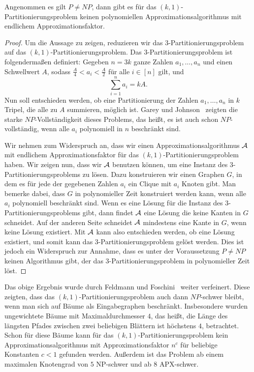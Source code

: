 \begin{thm}\label{thm:np_comp}
    Angenommen es gilt $P \neq NP$, dann gibt es für das $(k,1)$\hyp Partitionierungsproblem keinen polynomiellen Approximationsalgorithmus mit endlichem Approximationsfaktor.
\end{thm}
\begin{proof}
    Um die Aussage zu zeigen, reduzieren wir das $3$\hyp Partitionierungsproblem auf das $(k,1)$\hyp Partitionierungsproblem. 
    Das $3$\hyp Partitionierungsproblem ist folgendermaßen definiert: Gegeben $n = 3k$ ganze Zahlen $a_1,\ldots, a_n$ und einen Schwellwert $A$, sodass $\frac{A}{4} < a_i < \frac{A}{2}$ für alle $i \in [n]$ gilt, und 
    \begin{equation*}
        \sum_{i=1}^{n} a_i = kA.
    \end{equation*}
    Nun soll entschieden werden, ob eine Partitionierung der Zahlen $a_1, \ldots, a_n$ in $k$ Tripel, die alle zu $A$ summieren, möglich ist. 
    Garey und Johnson~\parencite{gj79} zeigten die starke $NP$\hyp Vollständigkeit dieses Problems, das heißt, es ist auch schon $NP$\hyp vollständig, wenn alle $a_i$ polynomiell in $n$ beschränkt sind.

    Wir nehmen zum Widerspruch an, dass wir einen Approximationsalgorithmus $\mathcal{A}$ mit endlichem Approximationsfaktor für das $(k,1)$\hyp Partitionierungsproblem haben. 
    Wir zeigen nun, dass wir $\mathcal{A}$ benutzen können, um eine Instanz des $3$\hyp Partitionierungsproblems zu lösen.
    Dazu konstruieren wir einen Graphen $G$, in dem es für jede der gegebenen Zahlen $a_i$ ein Clique mit $a_i$ Knoten gibt.
	Man bemerke dabei, dass $G$ in polynomieller Zeit konstruiert werden kann, wenn alle $a_i$ polynomiell beschränkt sind.
    Wenn es eine Lösung für die Instanz des $3$\hyp Partitionierungsproblems gibt, dann findet $\mathcal{A}$ eine Lösung die keine Kanten in $G$ schneidet. 
    Auf der anderen Seite schneidet $\mathcal{A}$ mindestens eine Kante in $G$, wenn keine Lösung existiert.
    Mit $\mathcal{A}$ kann also entschieden werden, ob eine Lösung existiert, und somit kann das $3$\hyp Partitionierungsproblem gelöst werden.
    Dies ist jedoch ein Widerspruch zur Annahme, dass es unter der Voraussetzung $P \neq NP$ keinen Algorithmus gibt, der das $3$\hyp Partitionierungsproblem in polynomieller Zeit löst.
\end{proof}

\begin{rem}
    Das obige Ergebnis wurde durch Feldmann und Foschini~\parencite{FF15} weiter verfeinert. 
    Diese zeigten, dass das $(k,1)$\hyp Partitionierungsproblem auch dann $NP$\hyp schwer bleibt, wenn man sich auf Bäume als Eingabegraphen beschränkt.
    Insbesondere wurden ungewichtete Bäume mit Maximaldurchmesser $4$, das heißt, die Länge des längsten Pfades zwischen zwei beliebigen Blättern ist höchstens $4$, betrachtet.
    Schon für diese Bäume kann für das $(k,1)$\hyp Partitionierungsproblem kein Approximationsalgorithmus mit Approximationsfaktor $n^c$ für beliebige Konstanten $c < 1$ gefunden werden.
    Außerdem ist das Problem ab einem maximalen Knotengrad von $5$ NP-schwer und ab $8$ APX-schwer.
\end{rem}


